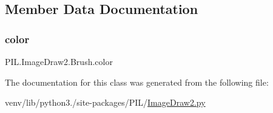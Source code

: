 \subsection{Member Data Documentation}
\mbox{\label{classPIL_1_1ImageDraw2_1_1Brush_a0d03d3bf1ae881c687a2f893a600b061}} 
\subsubsection{\texorpdfstring{color}{color}}
{\footnotesize\ttfamily P\+I\+L.\+Image\+Draw2.\+Brush.\+color}



The documentation for this class was generated from the following file\+:\begin{DoxyCompactItemize}
\item 
venv/lib/python3./site-\/packages/\+P\+I\+L/\hyperlink{ImageDraw2_8py}{Image\+Draw2.\+py}\end{DoxyCompactItemize}
